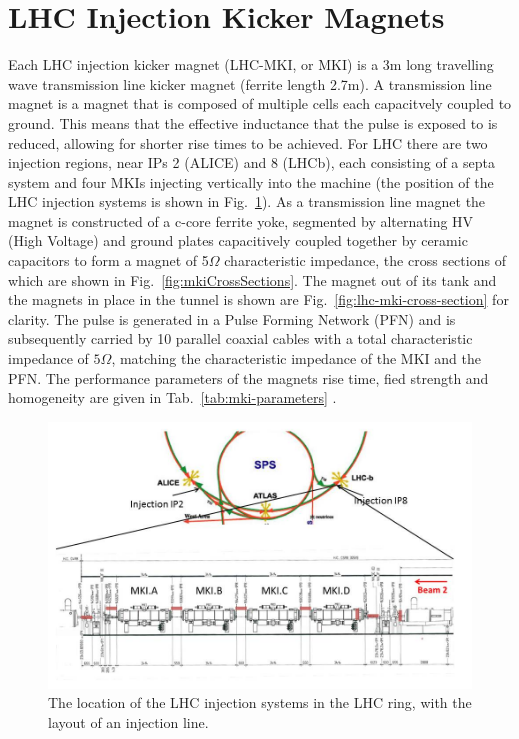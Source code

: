 \section{LHC Injection Kicker Magnets}

Each LHC injection kicker magnet (LHC-MKI, or MKI) is a 3m long travelling wave transmission line kicker magnet (ferrite length 2.7m). A transmission line magnet is a magnet that is composed of multiple cells each capacitvely coupled to ground. This means that the effective inductance that the pulse is exposed to is reduced, allowing for shorter rise times to be achieved. For LHC there are two injection regions, near IPs 2 (ALICE) and 8 (LHCb), each consisting of a septa system and four MKIs injecting vertically into the machine (the position of the LHC injection systems is shown in Fig.~\ref{fig:lhc-injection-systems}). As a transmission line magnet the magnet is constructed of a c-core ferrite yoke, segmented by alternating HV (High Voltage) and ground plates capacitively coupled together by ceramic capacitors to form a magnet of 5$\Omega$ characteristic impedance, the cross sections of which are shown in Fig.~\ref{fig:mkiCrossSections}. The magnet out of its tank and the magnets in place in the tunnel is shown are Fig.~\ref{fig:lhc-mki-cross-section} for clarity. The pulse is generated in a Pulse Forming Network (PFN) and is subsequently carried by 10 parallel coaxial cables with a total characteristic impedance of $5 \Omega$, matching the characteristic impedance of the MKI and the PFN. The performance parameters of the magnets rise time, fied strength and homogeneity are given in Tab.~\ref{tab:mki-parameters} \cite{Ducimetiere:mkiSpec}.

\begin{figure}
\begin{center}
\includegraphics[width=1.0\textwidth]{LHC_MKI/figures/injectionPointsLayout.jpg}
\end{center}
\caption{The location of the LHC injection systems in the LHC ring, with the layout of an injection line.}
\label{fig:lhc-injection-systems}
\end{figure}

